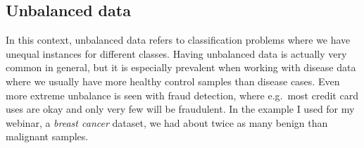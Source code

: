 \documentclass[]{book}
\newenvironment{Shaded}{\begin{snugshade}}{\end{snugshade}}
\newcommand{\CommentTok}[1]{\textcolor[rgb]{0.56,0.35,0.01}{\textit{#1}}}
\newcommand{\ControlFlowTok}[1]{\textcolor[rgb]{0.13,0.29,0.53}{\textbf{#1}}}
\newcommand{\DataTypeTok}[1]{\textcolor[rgb]{0.13,0.29,0.53}{#1}}
\newcommand{\DecValTok}[1]{\textcolor[rgb]{0.00,0.00,0.81}{#1}}
\newcommand{\KeywordTok}[1]{\textcolor[rgb]{0.13,0.29,0.53}{\textbf{#1}}}
\newcommand{\NormalTok}[1]{#1}
\newcommand{\OperatorTok}[1]{\textcolor[rgb]{0.81,0.36,0.00}{\textbf{#1}}}
\newcommand{\OtherTok}[1]{\textcolor[rgb]{0.56,0.35,0.01}{#1}}
\newcommand{\StringTok}[1]{\textcolor[rgb]{0.31,0.60,0.02}{#1}}
\begin{document}
\begin{Shaded}
\end{Shaded}

\hypertarget{unbalanced-data}{%
\subsection{Unbalanced data}\label{unbalanced-data}}

In this context, unbalanced data refers to classification problems where we have unequal instances for different classes. Having unbalanced data is actually very common in general, but it is especially prevalent when working with disease data where we usually have more healthy control samples than disease cases. Even more extreme unbalance is seen with fraud detection, where e.g.~most credit card uses are okay and only very few will be fraudulent. In the example I used for my webinar, a \emph{breast cancer} dataset, we had about twice as many benign than malignant samples.

\begin{Shaded}
\end{Shaded}
\end{document}

